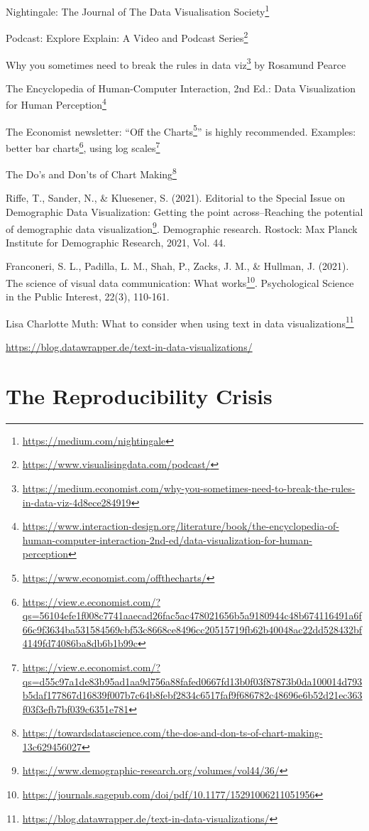 \documentclass[
  12pt,
  a5paper,
]{book}
\DeclareRobustCommand{\href}[2]{#2\footnote{\url{#1}}}
\begin{document}
\href{https://medium.com/nightingale}{Nightingale: The Journal of The Data Visualisation Society}

Podcast: \href{https://www.visualisingdata.com/podcast/}{Explore Explain: A Video and Podcast Series}

\href{https://medium.economist.com/why-you-sometimes-need-to-break-the-rules-in-data-viz-4d8ece284919}{Why you sometimes need to break the rules in data viz} by Rosamund Pearce

The Encyclopedia of Human-Computer Interaction, 2nd Ed.: \href{https://www.interaction-design.org/literature/book/the-encyclopedia-of-human-computer-interaction-2nd-ed/data-visualization-for-human-perception}{Data Visualization for Human Perception}

The Economist newsletter: ``\href{https://www.economist.com/offthecharts/}{Off the Charts}'' is highly recommended. Examples: \href{https://view.e.economist.com/?qs=56104efe1f008c7741aaecad26fac5ac478021656b5a9180944c48b674116491a6f66c9f3634ba531584569cbf53c8668ce8496cc20515719fb62b40048ac22dd528432bf4149fd74086ba8db6b1b99c}{better bar charts}, \href{https://view.e.economist.com/?qs=d55c97a1de83b95ad1aa9d756a88fafed0667fd13b0f03f87873b0da100014d793b5daf177867d16839f007b7c64b8febf2834c6517faf9f686782c48696e6b52d21ec363f03f3efb7bf039c6351e781}{using log scales}

\href{https://towardsdatascience.com/the-dos-and-don-ts-of-chart-making-13c629456027}{The Do's and Don'ts of Chart Making}

Riffe, T., Sander, N., \& Kluesener, S. (2021). Editorial to the Special Issue on Demographic Data Visualization: \href{https://www.demographic-research.org/volumes/vol44/36/}{Getting the point across--Reaching the potential of demographic data visualization}. Demographic research. Rostock: Max Planck Institute for Demographic Research, 2021, Vol. 44.

Franconeri, S. L., Padilla, L. M., Shah, P., Zacks, J. M., \& Hullman, J. (2021). \href{https://journals.sagepub.com/doi/pdf/10.1177/15291006211051956}{The science of visual data communication: What works}. Psychological Science in the Public Interest, 22(3), 110-161.

Lisa Charlotte Muth: \href{https://blog.datawrapper.de/text-in-data-visualizations/}{What to consider when using text in data visualizations}

\url{https://blog.datawrapper.de/text-in-data-visualizations/}

\hypertarget{the-reproducibility-crisis}{%
\section{The Reproducibility Crisis}\label{the-reproducibility-crisis}}
\end{document}
